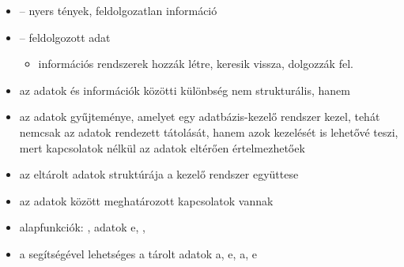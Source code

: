 \documentclass[main.tex]{subfiles}
\begin{document}
  \begin{itemize}
    \item {} – nyers tények, feldolgozatlan információ
    
    \item {} – feldolgozott adat
    \begin{itemize}
      \item információs rendszerek hozzák létre,
      keresik vissza, dolgozzák fel.
    \end{itemize}

    \item az adatok és információk közötti különbség
    nem strukturális, hanem 
    
    \item az  adatok gyűjteménye,
    amelyet egy adatbázis-kezelő rendszer kezel, tehát
    nemcsak az adatok rendezett tátolását, hanem azok
    kezelését is lehetővé teszi, mert kapcsolatok nélkül
    az adatok eltérően értelmezhetőek

    \item az eltárolt adatok struktúrája a
    kezelő rendszer együttese

    \item az adatok között meghatározott kapcsolatok vannak
    
    \item alapfunkciók: , adatok e,
    , 

    \item a  segítségével lehetséges a tárolt adatok
    a, e,
    a, e
  \end{itemize}
\end{document}
